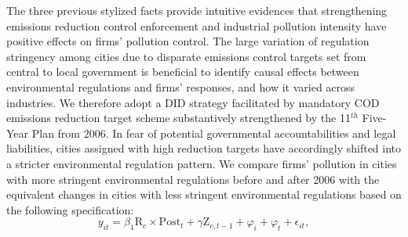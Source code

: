 \documentclass[12pt,english]{article}
\begin{document}
The three previous stylized facts provide intuitive evidences that strengthening emissions reduction control enforcement and industrial pollution intensity have positive effects on firms' pollution control. The large variation of regulation stringency among cities due to disparate emissions control targets set from central to local government is beneficial to identify causal effects between environmental regulations and firms' responses, and how it varied across industries.
We therefore adopt a DID strategy facilitated by mandatory COD emissions reduction target scheme substantively strengthened by the 11$^{th}$ Five-Year Plan from 2006. In fear of potential governmental accountabilities and legal liabilities, cities assigned with high reduction targets have accordingly shifted into a stricter environmental regulation pattern. We compare firms' pollution in cities with more stringent environmental regulations before and after 2006 with the equivalent changes in cities with less stringent environmental regulations based on the following specification:
\begin{equation} \label{eq:baseline_reg}
y_{it}=\beta_1 \text{R}_{c} \times \text{Post}_{t} + \gamma\text{Z}_{c,t-1} +\varphi_{i}+\varphi_{t} +\epsilon_{it},
\end{equation}
\end{document}
